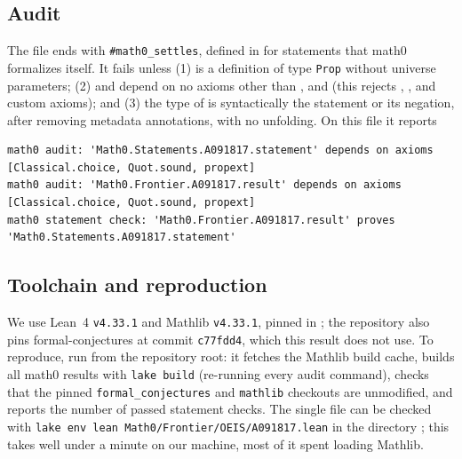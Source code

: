 \documentclass[11pt]{amsart}
\theoremstyle{plain}
\theoremstyle{definition}
\begin{document}
\subsection*{Audit}
The file ends with \texttt{\#math0\_settles}, defined in  for statements that math0 formalizes itself. It fails unless (1)  is a definition of type \texttt{Prop} without universe parameters; (2)  and  depend on no axioms other than ,  and  (this rejects , ,  and custom axioms); and (3) the type of  is syntactically the statement or its negation, after removing metadata annotations, with no unfolding. On this file it reports
\begin{lstlisting}
math0 audit: 'Math0.Statements.A091817.statement' depends on axioms [Classical.choice, Quot.sound, propext]
math0 audit: 'Math0.Frontier.A091817.result' depends on axioms [Classical.choice, Quot.sound, propext]
math0 statement check: 'Math0.Frontier.A091817.result' proves 'Math0.Statements.A091817.statement'
\end{lstlisting}

\subsection*{Toolchain and reproduction}
We use Lean~4 \cite{Lean4} \texttt{v4.33.1} and Mathlib \cite{Mathlib} \texttt{v4.33.1}, pinned in ; the repository also pins formal-conjectures \cite{FC} at commit \texttt{c77fdd4}, which this result does not use.
To reproduce, run  from the repository root: it fetches the Mathlib build cache, builds all math0 results with \texttt{lake build} (re-running every audit command), checks that the pinned \texttt{formal\_conjectures} and \texttt{mathlib} checkouts are unmodified, and reports the number of passed statement checks. The single file can be checked with \texttt{lake env lean Math0/Frontier/OEIS/A091817.lean} in the directory ; this takes well under a minute on our machine, most of it spent loading Mathlib.
\end{document}
